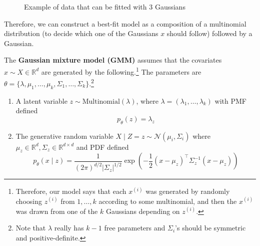 \documentclass{article}
\begin{document}
\begin{figure}[H]
    \caption{Example of data that can be fitted with 3 Gaussians}
  \end{figure}

  Therefore, we can construct a best-fit model as a composition of a multinomial distribution (to decide which one of the Gaussians $x$ should follow) followed by a Gaussian. 

  \begin{definition} 
    The \textbf{Gaussian mixture model (GMM)} assumes that the covariates $x \sim X \in \mathbb{R}^d$ are generated by the following.\footnote{Therefore, our model says that each $x^{(i)}$ was generated by randomly choosing $z^{(i)}$ from ${1, \ldots, k}$ according to some multinomial, and then the $x^{(i)}$ was drawn from one of the $k$ Gaussians depending on $z^{(i)}$.} The parameters are $\theta = \{\lambda, \mu_1, \ldots, \mu_k, \Sigma_1, \ldots, \Sigma_k\}$.\footnote{Note that $\lambda$ really has $k-1$ free parameters and $\Sigma_i$'s should be symmetric and positive-definite.}

    \begin{enumerate}
      \item A latent variable $z \sim \mathrm{Multinomial}(\lambda)$, where $\lambda = (\lambda_1, \ldots, \lambda_k)$ with PMF defined 
      \begin{equation}
        p_\theta (z) = \lambda_z
      \end{equation}

      \item The generative random variable $X \mid Z = z \sim \mathcal{N}(\mu_i, \Sigma_i)$ where $\mu_z \in \mathbb{R}^d, \Sigma_z \in \mathbb{R}^{d \times d}$ and PDF defined 
      \begin{equation}
        p_\theta (x \mid z) = \frac{1}{(2\pi)^{d/2}|\Sigma_z|^{1/2}} \exp\left(-\frac{1}{2}(x-\mu_z)^\top\Sigma_z^{-1}(x-\mu_z)\right)
      \end{equation}
    \end{enumerate}
  \end{definition}
\end{document}
